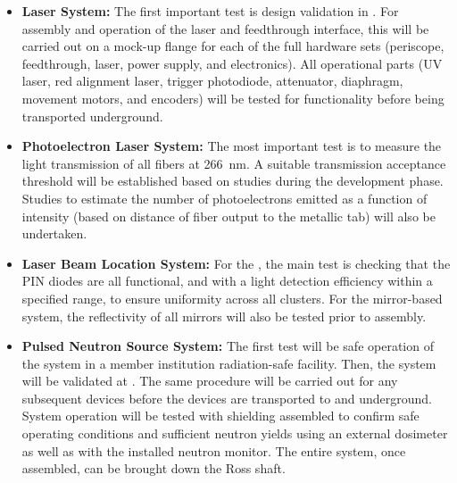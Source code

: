 \begin{itemize}
    \item {\bf Laser System:} The first %
    important test is  design validation in . For assembly and operation of the laser and feedthrough interface, this will be carried out on a mock-up flange for each of the full hardware sets (periscope, feedthrough, laser, power supply, and electronics). All operational parts (UV laser, red alignment laser, trigger photodiode, attenuator, diaphragm, movement motors, and encoders) will be tested for functionality before being transported underground.
    \item {\bf Photoelectron Laser System:} The most important test is to measure the light transmission of all fibers at \SI{266}{\nano\m}. A suitable transmission acceptance threshold will be established based on studies during the development phase. Studies to estimate the number of photoelectrons emitted as a function of intensity (based on distance of fiber output to the metallic tab) will also be undertaken.
    \item {\bf Laser Beam Location System:} For the , the main test is checking that the PIN diodes are all functional, and with a light detection efficiency within a specified range, to ensure uniformity across all clusters. For the mirror-based system, the reflectivity of all mirrors will also be tested prior to assembly.
    \item {\bf Pulsed Neutron Source System:} The first test will be safe operation of the system in a member institution radiation-safe facility. Then, the system will be validated at . The same procedure %
    will be carried out for any subsequent devices before the devices are transported to  and underground. System operation will be tested with shielding assembled to confirm safe operating conditions and sufficient neutron yields using an external dosimeter as well as with the installed neutron monitor. The entire system, once assembled, can be brought down the Ross shaft.
\end{itemize}
